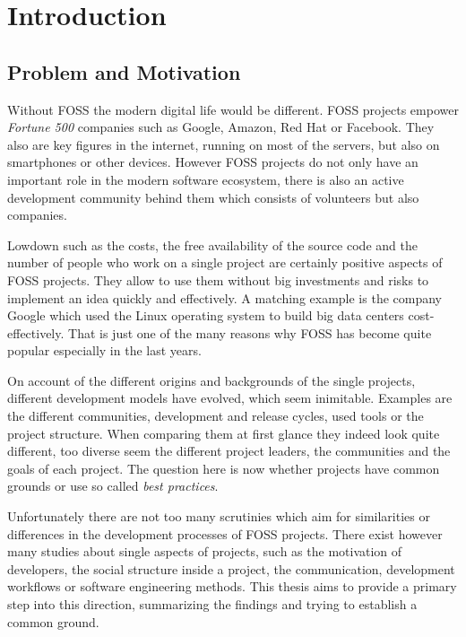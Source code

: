 \chapter{Introduction} %
\label{chap:introduction}

\section{Problem and Motivation} %

Without \ac{FOSS} the modern digital life would be different. \ac{FOSS}
projects empower \emph{Fortune 500} companies such as Google, Amazon, Red Hat
or Facebook. They also are key figures in the internet, running on most of the
servers, but also on smartphones or other devices. However \ac{FOSS} projects
do not only have an important role in the modern software ecosystem, there is
also an active development community behind them which consists of volunteers
but also companies.

Lowdown such as the costs, the free availability of the source code and the
number of people who work on a single project are certainly positive aspects of
\ac{FOSS} projects. They allow to use them without big investments and risks to
implement an idea quickly and effectively. A matching example is the company
Google which used the Linux operating system to build big data centers
cost-effectively. That is just one of the many reasons why \ac{FOSS} has become
quite popular especially in the last years.

On account of the different origins and backgrounds of the single projects,
different development models have evolved, which seem inimitable. Examples are
the different communities, development and release cycles, used tools or the
project structure. When comparing them at first glance they indeed look quite
different, too diverse seem the different project leaders, the communities and
the goals of each project. The question here is now whether projects have
common grounds or use so called \emph{best practices}.

Unfortunately there are not too many scrutinies which aim for similarities or
differences in the development processes of \ac{FOSS} projects. There exist
however many studies about single aspects of projects, such as the motivation
of developers, the social structure inside a project, the communication,
development workflows or software engineering methods. This thesis aims to
provide a primary step into this direction, summarizing the findings and trying
to establish a common ground.

